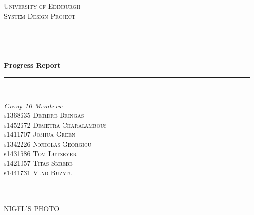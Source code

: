 \documentclass{article}
\begin{document}
\begin{titlepage}

\newcommand{\HRule}{\rule{\linewidth}{0.5mm}} %

\center %
\textsc{\LARGE University of Edinburgh}\\[1.5cm] %
\textsc{\Large System Design Project}\\[0.5cm] %
\date{January 2017}
\textsc{\large }\\[0.5cm] %
\HRule \\[0.4cm]
{ \huge \bfseries Progress Report}\\[0.4cm] %
\HRule \\[1.5cm]
\begin{minipage}{0.7\textwidth}
\begin{flushleft} \large
\emph{Group 10 Members:}\\
s1368635 \textsc{Deirdre Bringas}
\\s1452672 \textsc{Demetra Charalambous}
\\s1411707 \textsc{Joshua Green}
\\s1342226 \textsc{Nicholas Georgiou}
\\s1431686 \textsc{Tom Lutzeyer}
\\s1421057 \textsc{Titas Skrebe}
\\s1441731 \textsc{Vlad Buzatu}
\end{flushleft}
\end{minipage}\\[4cm]
\\
\textsc{\Large NIGEL'S PHOTO}\\[0.5cm] 

\end{titlepage}

\newpage
\end{document}
